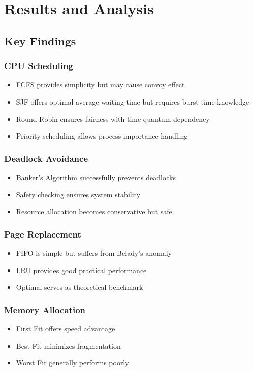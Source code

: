 \documentclass[12pt,a4paper]{article}
\begin{document}
\section{Results and Analysis}

\subsection{Key Findings}

\subsubsection{CPU Scheduling}
\begin{itemize}
    \item FCFS provides simplicity but may cause convoy effect
    \item SJF offers optimal average waiting time but requires burst time knowledge
    \item Round Robin ensures fairness with time quantum dependency
    \item Priority scheduling allows process importance handling
\end{itemize}

\subsubsection{Deadlock Avoidance}
\begin{itemize}
    \item Banker's Algorithm successfully prevents deadlocks
    \item Safety checking ensures system stability
    \item Resource allocation becomes conservative but safe
\end{itemize}

\subsubsection{Page Replacement}
\begin{itemize}
    \item FIFO is simple but suffers from Belady's anomaly
    \item LRU provides good practical performance
    \item Optimal serves as theoretical benchmark
\end{itemize}

\subsubsection{Memory Allocation}
\begin{itemize}
    \item First Fit offers speed advantage
    \item Best Fit minimizes fragmentation
    \item Worst Fit generally performs poorly
\end{itemize}
\end{document}
